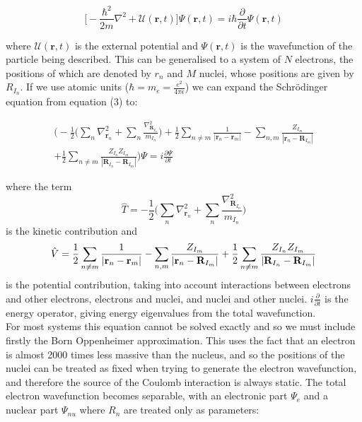 \documentclass[10pt]{article}
\begin{document}
\begin{equation}
	\biggr[-\frac{\hbar^2}{2m}\nabla^2+\mathcal{U}(\textbf{r},t)\biggr]\Psi(\textbf{r},t) = i\hbar\frac{\partial}{\partial t}\Psi(\textbf{r},t)
\end{equation}

where $\mathcal{U}(\textbf{r},t)$ is the external potential and $\Psi(\textbf{r},t)$ is the wavefunction of the particle being described. This can be generalised to a system of $N$ electrons, the positions of which are denoted by \textbf{$r_n$} and $M$ nuclei, whose positions are given by \textbf{$R_{I_n}$}. If we use atomic units ($\hbar = m_e = \frac{e^2}{4\pi\epsilon}$) we can expand the Schrödinger equation from equation (3) to:

\begin{gather*}
	\biggr(-\frac{1}{2}\biggr(\sum_n\nabla^2_{\textbf{r}_n}+\sum_{n}\frac{\nabla^2_{\textbf{R}_{I_n}}}{m_{I_n}}\biggr)+\frac{1}{2}\sum_{n\not=m}\frac{1}{|\textbf{r}_n-\textbf{r}_m|}-\sum_{n,m}\frac{Z_{I_m}}{|\textbf{r}_n - \textbf{R}_{I_m}|}\\
	+\frac{1}{2}\sum_{n\not=m}\frac{Z_{I_n}Z_{I_m}}{|\textbf{R}_{I_n}-\textbf{R}_{I_m}|}\biggr)\Psi = i\frac{\partial\Psi}{\partial t}
\end{gather*}

where the term $$\hat{T} = -\frac{1}{2}\biggr(\sum_n\nabla^2_{\textbf{r}_n}+\sum_{n}\frac{\nabla^2_{\textbf{R}_{I_n}}}{m_{I_n}}\biggr)$$ is the kinetic contribution and $$\hat{V}=\frac{1}{2}\sum_{n\not=m}\frac{1}{|\textbf{r}_n-\textbf{r}_m|}-\sum_{n,m}\frac{Z_{I_m}}{|\textbf{r}_n - \textbf{R}_{I_m}|}\\
+\frac{1}{2}\sum_{n\not=m}\frac{Z_{I_n}Z_{I_m}}{|\textbf{R}_{I_n}-\textbf{R}_{I_m}|}$$ is the potential contribution, taking into account interactions between electrons and other electrons, electrons and nuclei, and nuclei and other nuclei.  $i\frac{\partial}{\partial t}$ is the energy operator, giving energy eigenvalues from the total wavefunction.\\

For most systems this equation cannot be solved exactly and so we must include firstly the Born Oppenheimer approximation. This uses the fact that an electron is almost 2000 times less massive than the nucleus, and so the positions of the nuclei can be treated as fixed when trying to generate the electron wavefunction, and therefore the source of the Coulomb interaction is always static. The total electron wavefunction becomes separable, with an electronic part $\Psi_e$ and a nuclear part $\Psi_{nu}$ where $R_n$ are treated only as parameters:
\end{document}

